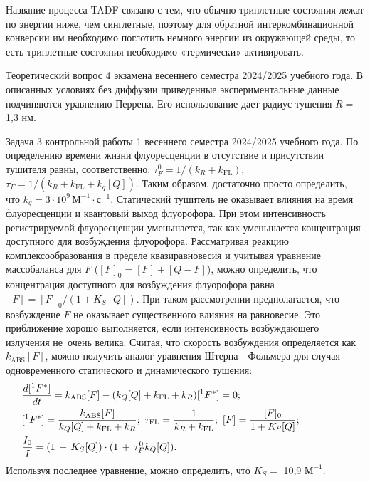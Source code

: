 Название процесса TADF связано с тем, что обычно триплетные состояния лежат по энергии ниже, чем синглетные, поэтому для обратной интеркомбинационной конверсии им необходимо поглотить немного энергии из окружающей среды, то есть триплетные состояния необходимо «термически» активировать.\par
{} Теоретический вопрос 4 экзамена весеннего семестра 2024/2025 учебного года. В описанных условиях без диффузии приведенные экспериментальные данные подчиняются уравнению Перрена. Его использование дает радиус тушения $R =$ 1,3 нм.\par
{} Задача 3 контрольной работы 1 весеннего семестра 2024/2025 учебного года. По определению времени жизни флуоресценции в отсутствие и присутствии тушителя равны, соответственно: $\tau_{F}^{0}=1/(k_R+k_{\text{FL}})$, $\tau_{F}=1/(k_R+k_{\text{FL}}+k_q[Q])$. Таким образом, достаточно просто определить, что $k_q=\text{3}\cdot \text{10}^\text{9}\,\text{М}^{-1}\cdot \text{с}^{-1}$. Статический тушитель не оказывает влияния на время флуоресценции и квантовый выход флуорофора. При этом интенсивность регистрируемой флуоресценции уменьшается, так как уменьшается концентрация доступного для возбуждения флуорофора. Рассматривая реакцию комплексообразования в пределе квазиравновесия и учитывая уравнение массобаланса для $F$ ($[F]_0=[F]+[Q-F]$), можно определить, что концентрация доступного для возбуждения флуорофора равна $[F]=[F]_0/(1+K_S[Q])$. При таком рассмотрении предполагается, что возбуждение $F$ не оказывает существенного влияния на равновесие. Это приближение хорошо выполняется, если интенсивность возбуждающего излучения не~очень велика. Считая, что скорость возбуждения определяется как $k_{\text{ABS}}[F]$, можно получить аналог уравнения Штерна—Фольмера для случая одновременного статического и динамического тушения:
\begin{align*}
& \frac{d[^1F^*]}{dt}=k_{\text{ABS}}[F]-(k_Q[Q]+k_{\text{FL}}+k_R)[^1F^*]=0;\hspace{17mm}\\
& [^1F^*]=\frac{k_{\text{ABS}}[F]}{k_Q[Q]+k_{\text{FL}}+k_R}; \,\, \tau_{\text{FL}}=\frac{1}{k_R+k_{\text{FL}}};\,\, [F]=\frac{[F]_0}{1+K_S[Q]};\hspace{17mm}\\
& \frac{I_0}{I}=(1\,+\,K_S[Q])\cdot(1\,+\,\tau_{F}^{0} k_Q[Q]).\hspace{17mm}
\end{align*}
Используя последнее уравнение, можно определить, что $K_S=$ 10,9 $\text{М}^{-1}.$\par
\newpage


